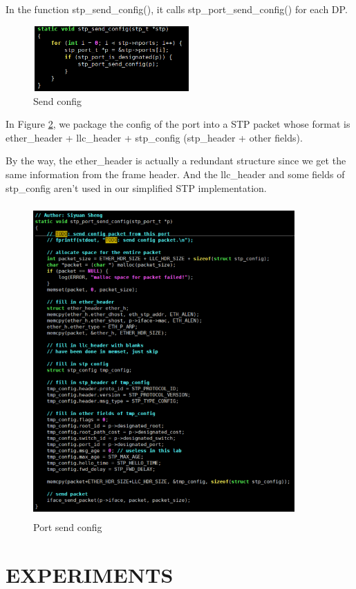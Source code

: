\documentclass{article}
\begin{document}
In the function stp\_send\_config(), it calls stp\_port\_send\_config() for each DP.

\begin{figure}
	\centering
	\includegraphics[width=6cm, height=2.5cm]{send_config.png}
	\caption{Send config}
	\label{send_config}
\end{figure}

In Figure \ref{port_send_config}, we package the config of the port into a STP packet whose format is ether\_header + llc\_header + stp\_config (stp\_header + other fields).

By the way, the ether\_header is actually a redundant structure since we get the same information from the frame header. And the llc\_header and some fields of stp\_config aren't used in our simplified STP implementation.

\begin{figure}
	\centering
	\includegraphics[width=10cm, height=12cm]{port_send_config.png}
	\caption{Port send config}
	\label{port_send_config}
\end{figure}

\section{EXPERIMENTS}
\end{document}
